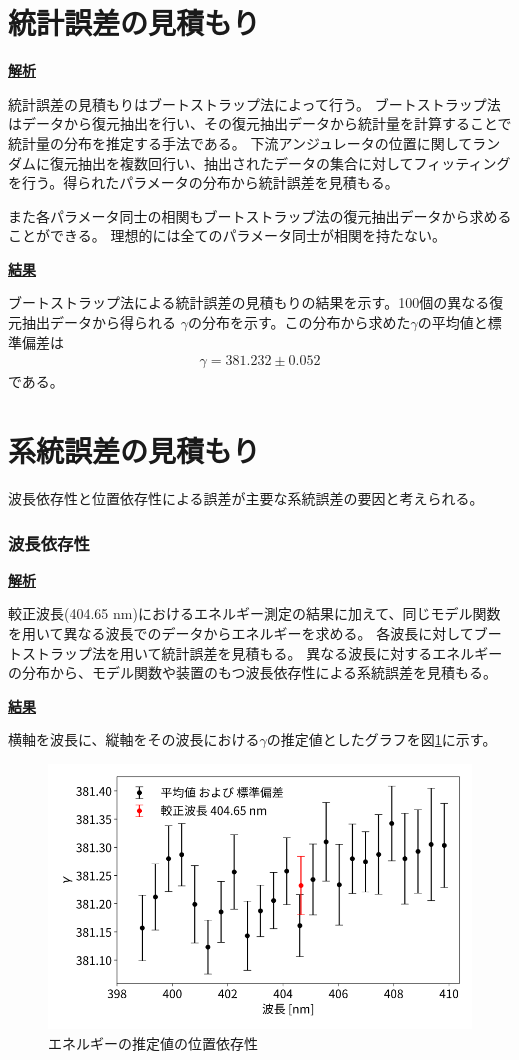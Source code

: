 \documentclass[a4paper,11pt,uplatex]{jsbook}
\begin{document}
\section{統計誤差の見積もり}
\noindent \textbf{\underline{解析}}\par
統計誤差の見積もりはブートストラップ法によって行う。
ブートストラップ法はデータから復元抽出を行い、その復元抽出データから統計量を計算することで統計量の分布を推定する手法である。
下流アンジュレータの位置に関してランダムに復元抽出を複数回行い、抽出されたデータの集合に対してフィッティングを行う。得られたパラメータの分布から統計誤差を見積もる。

また各パラメータ同士の相関もブートストラップ法の復元抽出データから求めることができる。
理想的には全てのパラメータ同士が相関を持たない。

\noindent \textbf{\underline{結果}}\par
ブートストラップ法による統計誤差の見積もりの結果を示す。100個の異なる復元抽出データから得られる
$\gamma$の分布を示す。この分布から求めた$\gamma$の平均値と標準偏差は
\begin{eqnarray}
  \gamma = 381.232 \pm 0.052
\end{eqnarray}
である。
\section{系統誤差の見積もり}
波長依存性と位置依存性による誤差が主要な系統誤差の要因と考えられる。
\subsubsection{波長依存性}
\noindent \textbf{\underline{解析}}\par
較正波長(404.65 nm)におけるエネルギー測定の結果に加えて、同じモデル関数を用いて異なる波長でのデータからエネルギーを求める。
各波長に対してブートストラップ法を用いて統計誤差を見積もる。
異なる波長に対するエネルギーの分布から、モデル関数や装置のもつ波長依存性による系統誤差を見積もる。

\noindent \textbf{\underline{結果}}\par
横軸を波長に、縦軸をその波長における$\gamma$の推定値としたグラフを図\ref{wldep}に示す。
\begin{figure}[h]
  \centering
  \includegraphics[width=0.8\linewidth]{image/4-wldep.png}
  \caption{エネルギーの推定値の位置依存性}\label{wldep}
\end{figure}
\end{document}

